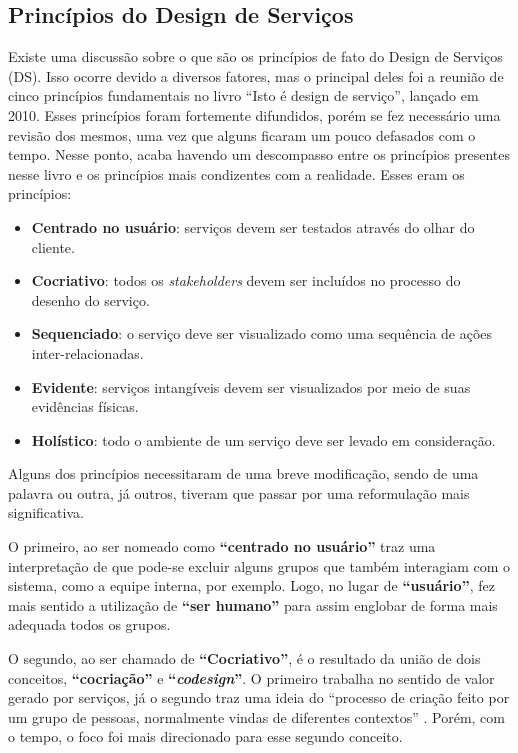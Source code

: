 \subsection{Princípios do Design de Serviços}

Existe uma discussão sobre o que são os princípios de fato do Design de Serviços (DS). Isso ocorre devido a diversos fatores, mas o principal deles foi a reunião de cinco princípios fundamentais no livro ``Isto é design de serviço'', lançado em 2010. Esses princípios foram fortemente difundidos, porém se fez necessário uma revisão dos mesmos, uma vez que alguns ficaram um pouco defasados com o tempo. Nesse ponto, acaba havendo um descompasso entre os princípios presentes nesse livro e os princípios mais condizentes com a realidade. Esses eram os princípios:

\begin{itemize}
	\item \textbf{Centrado no usuário}: serviços devem ser testados através do olhar do cliente.
	\item \textbf{Cocriativo}: todos os \textit{stakeholders} devem ser incluídos no processo do desenho do serviço.
	\item \textbf{Sequenciado}: o serviço deve ser visualizado como uma sequência de ações inter-relacionadas.
	\item \textbf{Evidente}: serviços intangíveis devem ser visualizados por meio de suas evidências físicas.
	\item \textbf{Holístico}: todo o ambiente de um serviço deve ser levado em consideração.
\end{itemize}

Alguns dos princípios necessitaram de uma breve modificação, sendo de uma palavra ou outra, já outros, tiveram que passar por uma reformulação mais significativa.

O primeiro, ao ser nomeado como \textbf{``centrado no usuário''} traz uma interpretação de que pode-se excluir alguns grupos que também interagiam com o sistema, como a equipe interna, por exemplo. Logo, no lugar de \textbf{``usuário''}, fez mais sentido a utilização de \textbf{``ser humano''} para assim englobar de forma mais adequada todos os grupos.

O segundo, ao ser chamado de \textbf{``Cocriativo''}, é o resultado da união de dois conceitos, \textbf{``cocriação''} e \textbf{``\textit{codesign}''}. O primeiro trabalha no sentido de valor gerado por serviços, já o segundo traz uma ideia do ``processo de criação feito por um grupo de pessoas, normalmente vindas de diferentes contextos'' \cite{Stickdorn2019}. Porém, com o tempo, o foco foi mais direcionado para esse segundo conceito.


